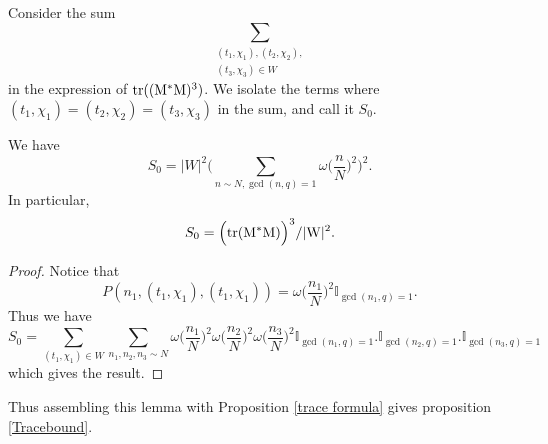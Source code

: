 Consider the sum \[\sum_{\substack{(t_1,\chi_1),(t_2,\chi_2),\\(t_3,\chi_3)\in W}}\]  in the expression of $\rm{tr}((M^*M)^3)$.
We isolate the terms where $(t_1,\chi_1)=(t_2,\chi_2)=(t_3,\chi_3)$ in the sum, and call it $S_0$.

\begin{lemma}
    We have \[
    S_0 = |W|^2\Bigg(\sum_{n\sim N, \gcd(n,q)=1} \omega\Big(\frac{n}{N}\Big)^2 \Bigg)^2.
    \]
    In particular, \[
    S_0 =  \Big(\rm{tr}(M^*M)\Big)^3/|W|^2.
    \]
\end{lemma}
\begin{proof}
    Notice that \[
    P(n_1,(t_1,\chi_1),(t_1,\chi_1)) = \omega\Big(\frac{n_1}{N}\Big)^2 \mathbb{I}_{\gcd(n_1,q)=1}.
    \]
    Thus we have \[
    S_0 = \sum_{(t_1,\chi_1)\in W} \sum_{n_1,n_2,n_3 \sim N}\omega\Big(\frac{n_1}{N}\Big)^2 \omega\Big(\frac{n_2}{N}\Big)^2 \omega\Big(\frac{n_3}{N}\Big)^2 \mathbb{I}_{\gcd(n_1,q)=1}.\mathbb{I}_{\gcd(n_2,q)=1}.\mathbb{I}_{\gcd(n_3,q)=1}
    \]
    which gives the result.
\end{proof}
Thus assembling this lemma with Proposition \ref{trace formula} gives proposition \ref{Tracebound}.

